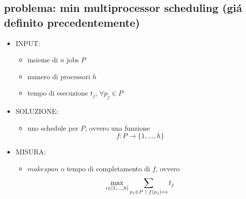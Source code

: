 \subsection*{problema: min multiprocessor scheduling (gi\'a definito precedentemente)}
\begin{flushleft}
	\begin{itemize}
		\item INPUT:
		\begin{itemize}
			\item insieme di $n$ jobs $P$
			\item numero di processori $h$
			\item tempo di esecuzione $t_j$, $\forall p_j\in P$
		\end{itemize}
		\item SOLUZIONE:
		\begin{itemize}
			\item uno schedule per $P$, ovvero una funzione
				$$f:P\rightarrow\{1,\ldots,h\}$$
		\end{itemize}
		\item MISURA:
		\begin{itemize}
			\item $makespan$ o tempo di completamento di $f$, ovvero
				$$\max_{i\in[1,\ldots,h]}\sum_{p_j\in P\hspace{0.1cm}\vert\hspace{0.1cm}f(p_j)=i}t_j$$
		\end{itemize}
	\end{itemize}
\end{flushleft}



